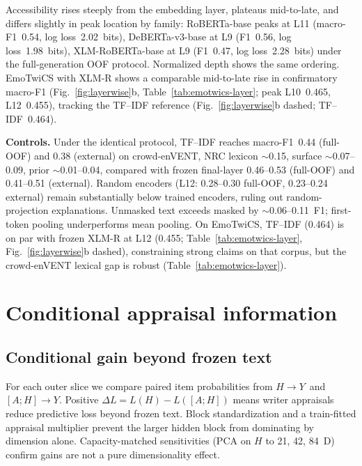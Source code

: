 \documentclass[11pt]{article}
\newcommand{\HtoY}{$H\!\rightarrow\!Y$}
\newcommand{\AHtoY}{$[A;H]\!\rightarrow\!Y$}
\begin{document}
Accessibility rises steeply from the embedding layer, plateaus mid-to-late, and differs slightly in peak location by family: RoBERTa-base peaks at L11 (macro-F1~0.54, log loss~2.02~bits), DeBERTa-v3-base at L9 (F1~0.56, log loss~1.98~bits), XLM-RoBERTa-base at L9 (F1~0.47, log loss~2.28~bits) under the full-generation OOF protocol. Normalized depth shows the same ordering. EmoTwiCS with XLM-R shows a comparable mid-to-late rise in confirmatory macro-F1 (Fig.~\ref{fig:layerwise}b, Table~\ref{tab:emotwics-layer}; peak L10~0.465, L12~0.455), tracking the TF--IDF reference (Fig.~\ref{fig:layerwise}b dashed; TF--IDF~0.464).

\textbf{Controls.} Under the identical protocol, TF--IDF reaches macro-F1~0.44 (full-OOF) and 0.38 (external) on crowd-enVENT, NRC lexicon $\sim$0.15, surface $\sim$0.07--0.09, prior $\sim$0.01--0.04, compared with frozen final-layer 0.46--0.53 (full-OOF) and 0.41--0.51 (external). Random encoders (L12: 0.28--0.30 full-OOF, 0.23--0.24 external) remain substantially below trained encoders, ruling out random-projection explanations. Unmasked text exceeds masked by $\sim$0.06--0.11~F1; first-token pooling underperforms mean pooling. On EmoTwiCS, TF--IDF (0.464) is on par with frozen XLM-R at L12 (0.455; Table~\ref{tab:emotwics-layer}, Fig.~\ref{fig:layerwise}b dashed), constraining strong claims on that corpus, but the crowd-enVENT lexical gap is robust (Table~\ref{tab:emotwics-layer}).

\section{Conditional appraisal information}
\label{sec:conditional}

\subsection{Conditional gain beyond frozen text}

For each outer slice we compare paired item probabilities from \HtoY\ and \AHtoY. Positive $\Delta L = L(H)-L([A;H])$ means writer appraisals reduce predictive loss beyond frozen text. Block standardization and a train-fitted appraisal multiplier prevent the larger hidden block from dominating by dimension alone. Capacity-matched sensitivities (PCA on $H$ to 21, 42, 84~D) confirm gains are not a pure dimensionality effect.
\end{document}
